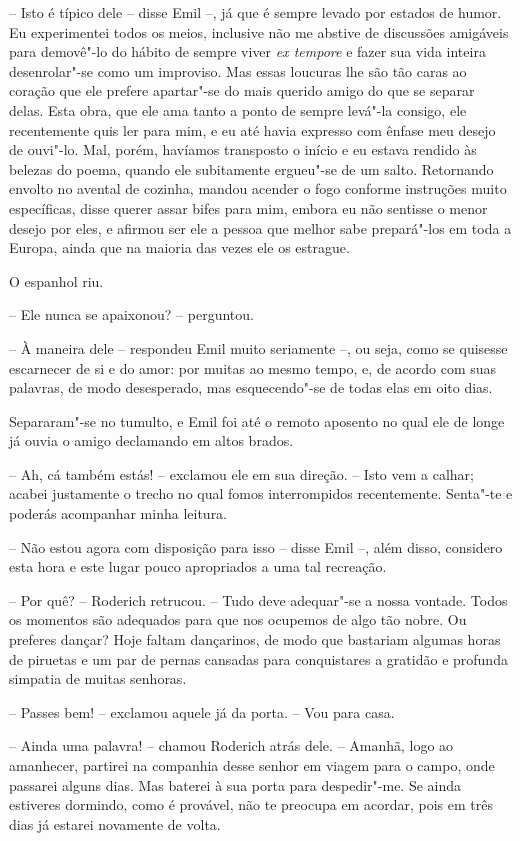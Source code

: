-- Isto é típico dele -- disse Emil --, já que é sempre levado por
estados de humor. Eu experimentei todos os meios, inclusive não me
abstive de discussões amigáveis para demovê"-lo do hábito de sempre
viver \textit{ex tempore} e fazer sua vida inteira desenrolar"-se como
um improviso. Mas essas loucuras lhe são tão caras ao coração que ele
prefere apartar"-se do mais querido amigo do que se separar delas. Esta
obra, que ele ama tanto a ponto de sempre levá"-la consigo, ele
recentemente quis ler para mim, e eu até havia expresso com ênfase meu
desejo de ouvi"-lo. Mal, porém, havíamos transposto o início e eu estava
rendido às belezas do poema, quando ele subitamente ergueu"-se de um
salto. Retornando envolto no avental de cozinha, mandou acender o fogo
conforme instruções muito específicas, disse querer assar bifes para
mim, embora eu não sentisse o menor desejo por eles, e afirmou ser ele
a pessoa que melhor sabe prepará"-los em toda a Europa, ainda que na
maioria das vezes ele os estrague.

O espanhol riu.

-- Ele nunca se apaixonou? -- perguntou.

-- À maneira dele -- respondeu Emil muito seriamente --, ou seja, como
se quisesse escarnecer de si e do amor: por muitas ao mesmo tempo, e,
de acordo com suas palavras, de modo desesperado, mas esquecendo"-se de
todas elas em oito dias.

Separaram"-se no tumulto, e Emil foi até o remoto aposento no qual ele de
longe já ouvia o amigo declamando em altos brados.

-- Ah, cá também estás! -- exclamou ele em sua direção. -- Isto vem a
calhar; acabei justamente o trecho no qual fomos interrompidos
recentemente. Senta"-te e poderás acompanhar minha leitura.

-- Não estou agora com disposição para isso -- disse Emil --, além
disso, considero esta hora e este lugar pouco apropriados a uma tal
recreação.

-- Por quê? -- Roderich retrucou. -- Tudo deve adequar"-se a nossa
vontade. Todos os momentos são adequados para que nos ocupemos de algo
tão nobre. Ou preferes dançar? Hoje faltam dançarinos, de modo que
bastariam algumas horas de piruetas e um par de pernas cansadas para
conquistares a gratidão e profunda simpatia de muitas senhoras.

-- Passes bem! -- exclamou aquele já da porta. -- Vou para casa.

-- Ainda uma palavra! -- chamou Roderich atrás dele. -- Amanhã, logo ao
amanhecer, partirei na companhia desse senhor em viagem para o campo,
onde passarei alguns dias. Mas baterei à sua porta para despedir"-me. Se
ainda estiveres dormindo, como é provável, não te preocupa em acordar,
pois em três dias já estarei novamente de volta. 

